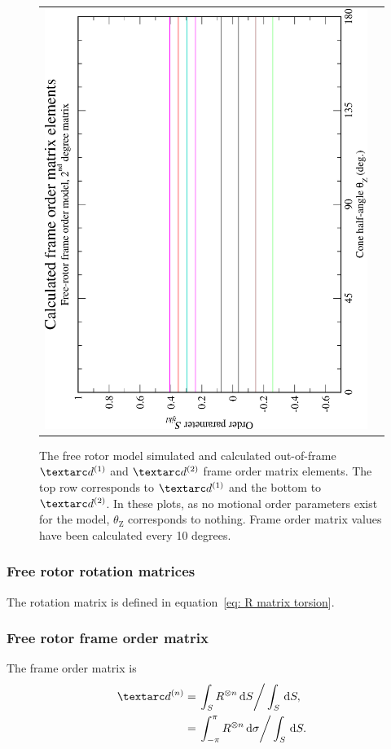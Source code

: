 \begin{figure}
\begin{tabular}{@{}cc@{}}
    \includegraphics[width=.35\textwidth,angle=270]{images/frame_order_matrix/Sijkl_free_rotor_out_of_frame_theta_z_calc.eps} \\
  \end{tabular}
  \caption[Free rotor simulated and calculated out-of-frame $\FOone$ and $\FOtwo$ elements.]{
    The free rotor model simulated and calculated out-of-frame $\FOone$ and $\FOtwo$ frame order matrix elements.
    The top row corresponds to $\FOone$ and the bottom to $\FOtwo$.
    In these plots, as no motional order parameters exist for the model, $\theta_\textrm{Z}$ corresponds to nothing.
    Frame order matrix values have been calculated every 10 degrees.
  }
  \label{fig: simulated and calculated out-of-frame 1st and 2nd degree free rotor frame order}
\end{figure}

\subsubsection{Free rotor rotation matrices}

The rotation matrix is defined in equation~\ref{eq: R matrix torsion}.

\subsubsection{Free rotor frame order matrix}

The frame order matrix is
\begin{subequations}
\begin{align}
    \FOn &= \left. \int_S R^{\otimes n} \diff S \right / \int_S \diff S , \\
         &= \left. \int_{-\pi}^{\pi} R^{\otimes n} \diff \sigma  \right / \int_S \diff S .
\end{align}
\end{subequations}

